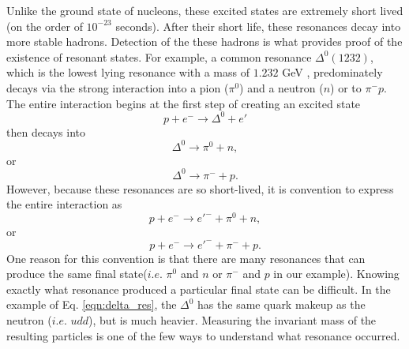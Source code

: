 Unlike the ground state of nucleons, these excited states are extremely short lived (on the order of $10^{-23}$ seconds). After their short life, these resonances decay into more stable hadrons. Detection of the these hadrons is what provides proof of the existence of resonant states. For example, a common resonance $\Delta^0(1232)$, which is the lowest lying resonance with a mass of $1.232$ GeV \cite{PDG}, predominately decays via the strong interaction into a pion ($\pi^0$) and a neutron ($n$) or to $\pi^-p$. The entire interaction begins at the first step of creating an excited state
\begin{equation}
p+e^- \longrightarrow \Delta^0 + e'
\end{equation}
then decays into
\begin{equation}
\nonumber
\Delta^0 \longrightarrow \pi^0 + n,
\end{equation}
or
\begin{equation}
\Delta^0 \longrightarrow \pi^- + p.
\end{equation}
However, because these resonances are so short-lived, it is convention to express the entire interaction as
\begin{equation}
\nonumber
p+e^- \longrightarrow e'^- + \pi^0 + n,
\end{equation}
or
\begin{equation}
\label{eqn:delta_res}
p+e^- \longrightarrow e'^- + \pi^- + p.
\end{equation}
One reason for this convention is that there are many resonances that can produce the same final state($i.e.$ $\pi^0$ and $n$ or $\pi^-$ and $p$ in our example). Knowing exactly what resonance produced a particular final state can be difficult. In the example of Eq. \ref{eqn:delta_res}, the $\Delta^0$ has the same quark makeup as the neutron ($i.e.$ $udd$), but is much heavier. Measuring the invariant mass of the resulting particles is one of the few ways to understand what resonance occurred. 

